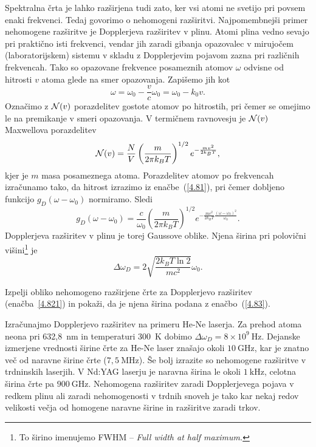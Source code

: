 Spektralna črta je lahko razširjena tudi zato, ker vsi atomi ne svetijo
pri povsem enaki frekvenci. Tedaj govorimo o nehomogeni 
razširitvi.
Najpomembnejši primer nehomogene razširitve je Dopplerjeva 
 razširitev v plinu. 
Atomi plina vedno sevajo pri praktično isti frekvenci, vendar jih zaradi gibanja
opazovalec v mirujočem (laboratorijskem) sistemu v skladu z Dopplerjevim pojavom 
zazna pri različnih frekvencah. Tako so opazovane frekvence posameznih atomov $\omega$
odvisne od hitrosti $v$ atoma glede na smer opazovanja. Zapišemo jih kot  
\begin{equation}
\omega=\omega_{0}-\frac{v}{c}\omega_{0}=\omega_{0}-k_{0}v.
\label{4.81}
\end{equation}
Označimo z ${\cal N}(v)$ porazdelitev gostote atomov po hitrostih, pri čemer se omejimo 
le na premikanje v smeri opazovanja. V termičnem ravnovesju je ${\cal N}(v)$
Maxwellova porazdelitev
\begin{equation}
{\cal N}(v)=\frac{N}{V}\left(\frac{m}{2\pi k_{B}T}\right)^{1/2}e^{-\frac{mv^{2}}{2k_{B}T}},
\label{4.82}
\end{equation}
kjer je $m$ masa posameznega atoma.
Porazdelitev atomov po frekvencah izračunamo tako, da hitrost izrazimo
iz enačbe~(\ref{4.81}), pri čemer dobljeno funkcijo $g_{D}(\omega-\omega_0)$
normiramo. Sledi
\begin{equation}
g_{D}(\omega-\omega_0)=\frac{c}{\omega_{0}}\left(\frac{m}{2\pi 
k_{B}T}\right)^{1/2}e^{-\frac{mc^{2}}{2k_{B}T}\frac{(\omega-\omega_{0})^{2}}{\omega_{0}}}.
\label{4.821}
\end{equation}
Dopplerjeva razširitev v plinu je torej Gaussove oblike.
Njena širina pri polovični 
višini\footnote{To širino imenujemo FWHM -- \it{Full width at half maximum}.} je
\begin{equation} 
\Delta\omega_{D}=2 \sqrt{\frac{2k_{B}T \ln 2}{mc^{2}}}\omega_{0}.
\label{4.83}
\end{equation}
\begin{definition}
Izpelji obliko nehomogeno razširjene črte za Dopplerjevo razširitev (enačba~\ref{4.821})
in pokaži, da je njena širina podana z enačbo~(\ref{4.83}).
\end{definition}

Izračunajmo Dopplerjevo razširitev na primeru He-Ne laserja. Za prehod
atoma neona pri 632,8~nm in temperaturi 300~K dobimo 
$\Delta\omega_{D}=8\times10^{9}~\si{\hertz}$. Dejanske izmerjene vrednosti širine 
črte za He-Ne laser 
znašajo okoli $10~\si{\giga\hertz}$, kar je znatno več od naravne širine
črte ($7,5~\si{\mega\hertz}$). Še bolj izrazite so nehomogene razširitve v trdninskih laserjih.
V Nd:YAG laserju je naravna širina le okoli $1~\si{\kilo\hertz}$, celotna širina črte
pa $900~\si{\giga\hertz}$. Nehomogena razširitev zaradi Dopplerjevega pojava v 
redkem plinu ali zaradi nehomogenosti v trdnih snoveh je tako kar nekaj redov velikosti 
večja od homogene naravne širine in razširitve zaradi trkov.

